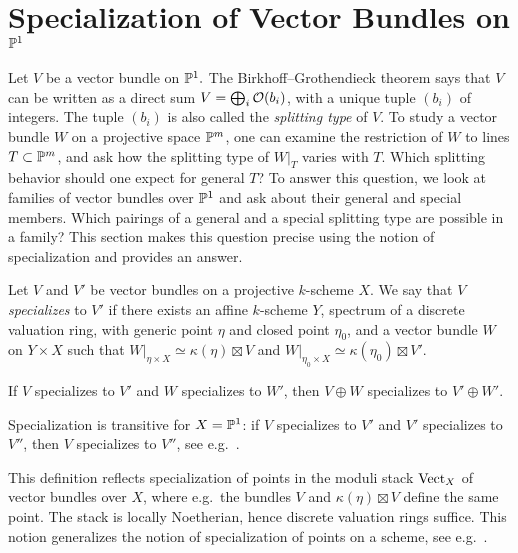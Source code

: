 \section{Specialization of Vector Bundles on \texorpdfstring{$\mathbb{P}^1$}{P1}}

Let $V$ be a vector bundle on $\mathbb{P}^1.$ The Birkhoff–Grothendieck theorem says that $V$ can be written as a direct sum $V=\bigoplus_i \mathcal{O}(b_i)$, with a unique tuple $(b_i)$ of integers. The tuple $(b_i)$ is also called the \emph{splitting type} of $V$. To study a vector bundle $W$ on a projective space $\mathbb{P}^m$, one can examine the restriction of $W$ to lines $T\subset \mathbb{P}^m$, and ask how the splitting type of $W|_T$ varies with $T$. Which splitting behavior should one expect for general $T$? To answer this question, we look at families of vector bundles over $\mathbb{P}^1$ and ask about their general and special members. Which pairings of a general and a special splitting type are possible in a family? This section makes this question precise using the notion of specialization and provides an answer.

\begin{definition}
	Let $ V$ and $V'$ be vector bundles on a projective $k$-scheme $X$. We say that $ V$ \emph{specializes} to $V'$ if there exists an affine $k$-scheme $Y$, spectrum of a discrete valuation ring, with generic point $\eta$ and closed point $\eta_0$, and a vector bundle $W$ on
	$Y\times X$
	such that
	$ W|_{\eta \times X} \simeq \kappa(\eta)\boxtimes V$
	and
	$ W|_{\eta_0 \times X} \simeq \kappa(\eta_0)\boxtimes V'$. 
\end{definition}

\begin{remark} \label{rem:specialization-sum}
	If $ V$ specializes to $ V'$ and $ W$ specializes to $ W'$, then $ V\oplus W$ specializes to $ V'\oplus W'$.
\end{remark}

\begin{remark}
	Specialization is transitive for $X=\mathbb{P}^1$: if $ V$ specializes to $V'$ and $V'$ specializes to $V''$, then $ V$ specializes to $V''$, see e.g.\ \cite[Cor.\ 6.14]{ramamathan-deformations}.
\end{remark}

\begin{remark}
	This definition reflects specialization of points in the moduli stack $\mathrm{Vect}_X$ of vector bundles over $X$, where e.g.\ the bundles $ V$ and $\kappa(\eta) \boxtimes  V$ define the same point. The stack is locally Noetherian, hence discrete valuation rings suffice. This notion generalizes the notion of specialization of points on a scheme, see e.g.\ \cite[Prop.\ 7.1.9]{egaii}.
\end{remark}

